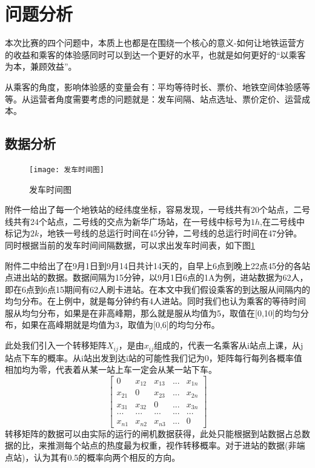 \documentclass[12pt,a4paper]{mcmthesis}
\begin{document}
    \section{问题分析}

    本次比赛的四个问题中，本质上也都是在围绕一个核心的意义-如何让地铁运营方的收益和乘客的体验感同时可以到达一个更好的水平，也就是如何更好的“以乘客为本，兼顾效益”。

    从乘客的角度，影响体验感的变量会有：平均等待时长、票价、地铁空间体验感等等。从运营者角度需要考虑的问题就是：发车间隔、站点选址、票价定价、运营成本。

    \subsection{数据分析}
    \begin{figure}[h!t]
        \centerline{\texttt{[image: 发车时间图]}\quad
        }
        \caption{\song\wuhao
        发车时间图}
        \label{fig:发车时间图}
    \end{figure}

    附件一给出了每一个地铁站的经纬度坐标，容易发现，一号线共有20个站点，二号线共有24个站点，二号线的交点为新华广场站，在一号线中标号为$1h$,在二号线中标记为$2k$，地铁一号线的总运行时间在45分钟，二号线的总运行时间在47分钟。同时根据当前的发车时间间隔数据，可以求出发车时间表，如下图\ref{fig:发车时间图}

    附件二中给出了在9月1日到9月14日共计14天的，自早上6点到晚上22点45分的各站点进出站的数据。数据间隔为15分钟，以9月1日6点的1A为例，进站数据为62人，即在6点到6点15期间有62人刷卡进站。在本文中我们假设乘客的到达服从间隔内的均匀分布。在上例中，就是每分钟约有4人进站。同时我们也认为乘客的等待时间服从均匀分布，如果是在非高峰期，那么就是服从均值为5，取值在[0,10]的均匀分布，如果在高峰期就是均值为3，取值为[0,6]的均匀分布。

    此处我们引入一个转移矩阵$X_{ij}$，是由$x_{ij}$组成的，代表一名乘客从i站点上课，从j站点下车的概率。从i站出发到达i站的可能性我们记为0，矩阵每行每列各概率值相加均为零，代表着从某一站上车一定会从某一站下车。
    \begin{equation}
        \begin{bmatrix}
            0 &x_{12}  &x_{13} &... & x_{1n}\\
            x_{21} &0  &x_{23} & ... &x_{2n} \\
            x_{31} & x_{32} &0 & ...&x_{3n} \\
            ...&  ... &   ...&  ... &...\\
            x_{n1} & x_{n2} &x_{n3} &... &0
        \end{bmatrix}
    \end{equation}
    转移矩阵的数据可以由实际的运行的闸机数据获得，此处只能根据到站数据占总数据的比，来推测每个站点的热度最为权重，视作转移概率。对于进站的数据(非端点站)，认为其有0.5的概率向两个相反的方向。
\end{document}
